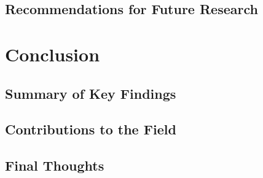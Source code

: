 \documentclass[12pt]{report}
\begin{document}
\section{Recommendations for Future Research}
\lipsum[1] %

\chapter{Conclusion}
\section{Summary of Key Findings}
\lipsum[1] %
\section{Contributions to the Field}
\lipsum[1] %
\section{Final Thoughts}
\lipsum[1] %

\printbibliography
\end{document}
